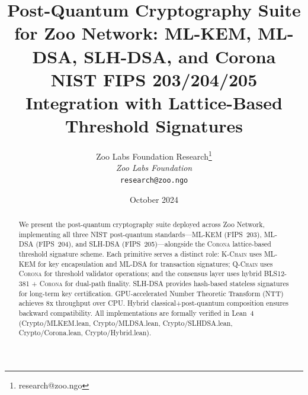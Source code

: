 \documentclass[11pt,letterpaper]{article}
\title{\textbf{Post-Quantum Cryptography Suite for Zoo Network: ML-KEM, ML-DSA, SLH-DSA, and Corona}\\
\large NIST FIPS 203/204/205 Integration with Lattice-Based Threshold Signatures}
\author{
Zoo Labs Foundation Research\thanks{research@zoo.ngo}\\
\textit{Zoo Labs Foundation}\\
\texttt{research@zoo.ngo}
}
\date{October 2024}
\theoremstyle{definition}
\theoremstyle{remark}
\newcommand{\Corona}{\textsc{Corona}}
\newcommand{\MLKEM}{\textsc{ML-KEM}}
\newcommand{\MLDSA}{\textsc{ML-DSA}}
\newcommand{\SLHDSA}{\textsc{SLH-DSA}}
\newcommand{\KChain}{\textsc{K-Chain}}
\newcommand{\QChain}{\textsc{Q-Chain}}
\begin{document}
\zoocoverpage

\begin{abstract}
We present the post-quantum cryptography suite deployed across Zoo Network, implementing all three NIST post-quantum standards---\MLKEM{} (FIPS~203), \MLDSA{} (FIPS~204), and \SLHDSA{} (FIPS~205)---alongside the \Corona{} lattice-based threshold signature scheme. Each primitive serves a distinct role: \KChain{} uses \MLKEM{} for key encapsulation and \MLDSA{} for transaction signatures; \QChain{} uses \Corona{} for threshold validator operations; and the consensus layer uses hybrid BLS12-381 + \Corona{} for dual-path finality. \SLHDSA{} provides hash-based stateless signatures for long-term key certification. GPU-accelerated Number Theoretic Transform (NTT) achieves 8x throughput over CPU. Hybrid classical+post-quantum composition ensures backward compatibility. All implementations are formally verified in Lean~4 (Crypto/MLKEM.lean, Crypto/MLDSA.lean, Crypto/SLHDSA.lean, Crypto/Corona.lean, Crypto/Hybrid.lean).
\end{abstract}

\tableofcontents
\newpage













\end{document}
